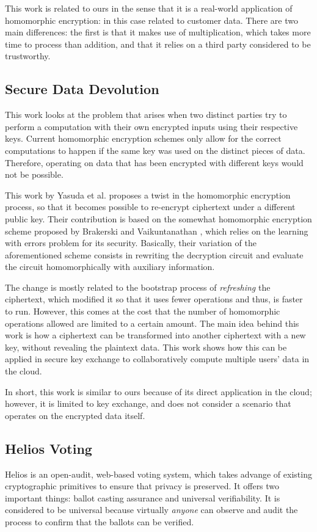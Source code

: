 This work is related to ours in the sense that it is a real-world application of homomorphic encryption: in this case related to customer data. There are two main differences: the first is that it makes use of multiplication, which takes more time to process than addition, and that it relies on a third party considered to be trustworthy. 

\subsection{Secure Data Devolution}
This work looks at the problem that arises when two distinct parties try to perform a computation with their own encrypted inputs using their respective keys. Current homomorphic encryption schemes only allow for the correct computations to happen if the same key was used on the distinct pieces of data. Therefore, operating on data that has been encrypted with different keys would not be possible. 

This work by Yasuda et al. \cite{Yasuda:2015:SDD:2732516.2732521} proposes a twist in the homomorphic encryption process, so that it becomes possible to re-encrypt ciphertext under a different public key. Their contribution is based on the somewhat homomorphic encryption scheme proposed by  Brakerski and Vaikuntanathan \cite{cryptoeprint:2011:277}, which relies on the learning with errors problem for its security.  Basically, their variation of the aforementioned scheme consists in rewriting the decryption circuit and evaluate the circuit homomorphically with auxiliary information.

The change is mostly related to the bootstrap process of \emph{refreshing} the ciphertext, which modified it so that it uses fewer operations and thus, is faster to run. However, this comes at the cost that the number of homomorphic operations allowed are limited to a certain amount. The main idea behind this work is how a ciphertext can be transformed into another ciphertext with a new key, without revealing the plaintext data. This work shows how this can be applied in secure key exchange to collaboratively compute multiple users' data in the cloud.

In short, this work is similar to ours because of its direct application in the cloud; however, it is limited to key exchange, and does not consider a scenario that operates on the encrypted data itself.

\subsection{{Helios Voting}}
Helios \cite{adida2008helios} is an open-audit, web-based voting system, which takes advange of existing cryptographic primitives to ensure that privacy is preserved. It offers two important things: ballot casting assurance and universal verifiability. It is considered to be universal because virtually \emph{anyone} can observe and audit the process to confirm that the ballots can be verified.

